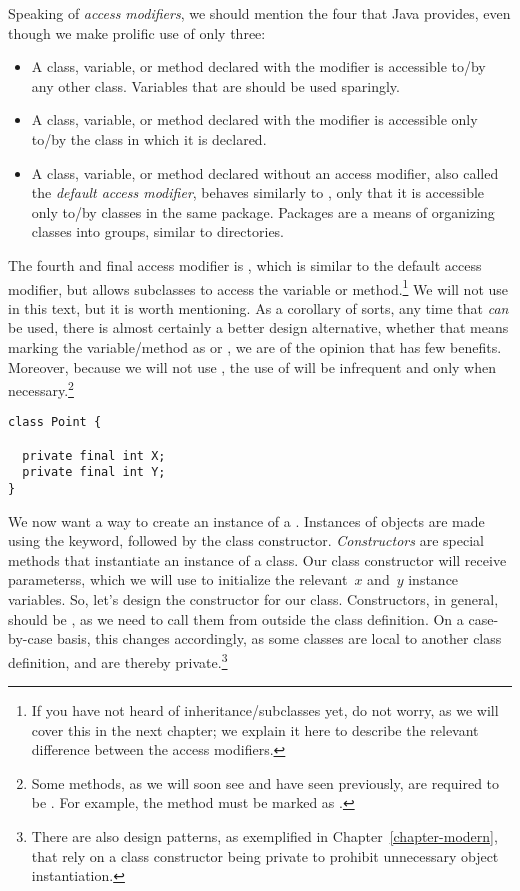 Speaking of \emph{access modifiers}, we should mention the four that Java provides, even though we make prolific use of only three:

\begin{itemize}
  \item A class, variable, or method declared with the  modifier is accessible to/by any other class. Variables that are  should be used sparingly.
  \item A class, variable, or method declared with the  modifier is accessible only to/by the class in which it is declared. 
  \item A class, variable, or method declared without an access modifier, also called the \emph{default access modifier}, behaves similarly to , only that it is accessible only to/by classes in the same package. Packages are a means of organizing classes into groups, similar to directories.
\end{itemize}

The fourth and final access modifier is , which is similar to the default access modifier, but allows subclasses to access the variable or method.\footnote{If you have not heard of inheritance/subclasses yet, do not worry, as we will cover this in the next chapter; we explain it here to describe the relevant difference between the access modifiers.} 
We will not use  in this text, but it is worth mentioning. 
As a corollary of sorts, any time that  \emph{can} be used, there is almost certainly a better design alternative, whether that means marking the variable/method as  or , we are of the opinion that  has few benefits. 
Moreover, because we will not use , the use of  will be infrequent and only when necessary.\footnote{Some methods, as we will soon see and have seen previously, are required to be . For example, the  method must be marked as .}

\begin{lstlisting}[language=MyJava]
class Point {

  private final int X;
  private final int Y;
}
\end{lstlisting}

We now want a way to create an instance of a . 
Instances of objects are made using the  keyword, followed by the class constructor. 
\emph{Constructors} are special methods that instantiate an instance of a class. 
Our  class constructor will receive parameterss, which we will use to initialize the relevant~$x$ and~$y$ instance variables. 
So, let's design the constructor for our  class. 
Constructors, in general, should be , as we need to call them from outside the class definition. 
On a case-by-case basis, this changes accordingly, as some classes are local to another class definition, and are thereby private.\footnote{There are also design patterns, as exemplified in Chapter~\ref{chapter-modern}, that rely on a class constructor being private to prohibit unnecessary object instantiation.} 

